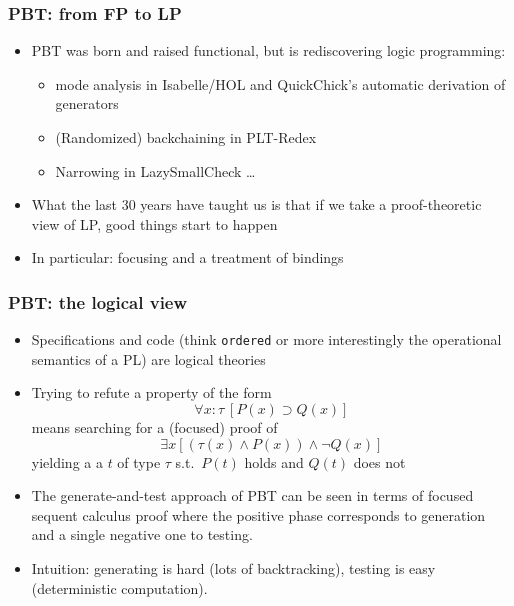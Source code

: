 \documentclass{beamer}
\newcommand{\red}[1]{{\color{red} #1}}
\newenvironment{myslide}[1]
    {\begin{frame}\frametitle{#1}}
    {\end{frame}}
\begin{document}
\begin{myslide}{PBT: from FP to LP}
  \begin{itemize}
  \item PBT  was born and raised functional, but is rediscovering logic programming:
    \begin{itemize}
    \item mode analysis in Isabelle/HOL and QuickChick's automatic derivation of 
        generators
    \item (Randomized) backchaining in PLT-Redex
    \item Narrowing in LazySmallCheck \dots

    \end{itemize}
  \item What the last 30 years have taught us is that if we take a
    \red{proof-theoretic} view of LP, good things start to happen
  \item In particular: \red{focusing} and a \red{treatment of
      bindings}
 
  \end{itemize}
\end{myslide}
\begin{frame}
  \frametitle{PBT: the logical view}
  \begin{itemize}
  \item Specifications and code (think \texttt{ordered} or more interestingly the operational semantics of a PL) are logical theories 
  \item Trying to refute a property of the form
    \[\forall x\colon\tau\ [P(x) \supset Q(x)]\] means searching for a (focused) proof of
    \[\exists x [(\tau(x)\land P(x)) \land \neg Q(x)]\] yielding a
    a $t$ of type $\tau$ s.t.\ $P(t)$ holds and $Q(t)$ does not %
  \item The generate-and-test approach of PBT can be seen in terms of
    focused sequent calculus proof where the \red{positive} phase
    corresponds to generation and a single \red{negative} one to
    testing.
  \item Intuition: generating is hard (lots of backtracking), testing is easy (deterministic computation).
  \end{itemize}
\end{frame}
\end{document}
